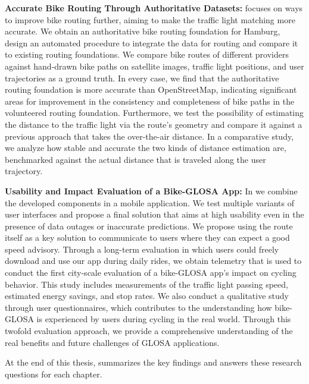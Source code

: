 \textbf{\color{cidarkblue}Accurate Bike Routing Through Authoritative Datasets:}  focuses on ways to improve bike routing further, aiming to make the traffic light matching more accurate. We obtain an authoritative bike routing foundation for Hamburg, design an automated procedure to integrate the data for routing and compare it to existing routing foundations. We compare bike routes of different providers against hand-drawn bike paths on satellite images, traffic light positions, and user trajectories as a ground truth. In every case, we find that the authoritative routing foundation is more accurate than OpenStreetMap, indicating significant areas for improvement in the consistency and completeness of bike paths in the volunteered routing foundation. Furthermore, we test the possibility of estimating the distance to the traffic light via the route's geometry and compare it against a previous approach that takes the over-the-air distance. In a comparative study, we analyze how stable and accurate the two kinds of distance estimation are, benchmarked against the actual distance that is traveled along the user trajectory.

\textbf{\color{cidarkblue}Usability and Impact Evaluation of a Bike-GLOSA App:} In  we combine the developed components in a mobile application. We test multiple variants of user interfaces and propose a final solution that aims at high usability even in the presence of data outages or inaccurate predictions. We propose using the route itself as a key solution to communicate to users where they can expect a good speed advisory. Through a long-term evaluation in which users could freely download and use our app during daily rides, we obtain telemetry that is used to conduct the first city-scale evaluation of a bike-GLOSA app's impact on cycling behavior. This study includes measurements of the traffic light passing speed, estimated energy savings, and stop rates. We also conduct a qualitative study through user questionnaires, which contributes to the understanding how bike-GLOSA is experienced by users during cycling in the real world. Through this twofold evaluation approach, we provide a comprehensive understanding of the real benefits and future challenges of GLOSA applications.

At the end of this thesis,  summarizes the key findings and answers these research questions for each chapter.